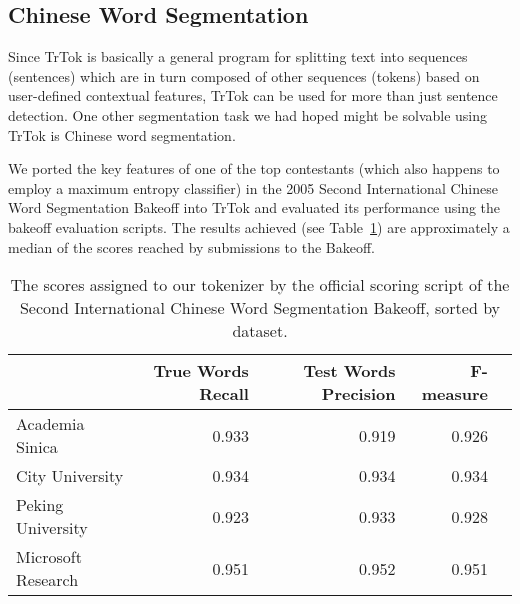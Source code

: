\subsection{Chinese Word Segmentation}

Since TrTok is basically a general program for splitting text into
sequences (sentences) which are in turn composed of other sequences
(tokens) based on user-defined contextual features, TrTok can be used
for more than just sentence detection. One other segmentation task we
had hoped might be solvable using TrTok is Chinese word segmentation.

We ported the key features of one of the top contestants (which also
happens to employ a maximum entropy classifier)
\cite{seg-chinese-maxent} in the 2005 Second International Chinese
Word Segmentation Bakeoff into TrTok and evaluated its performance
using the bakeoff evaluation scripts. The results achieved (see
Table~\ref{tbl:bakeoff-score}) are approximately a median of the
scores reached by submissions to the Bakeoff.

\begin{table}
  \begin{center}
    \begin{tabular}{ | l | r | r | r | r | }
      \hline
      & True Words Recall & Test Words Precision & F-measure \\ \hline
      Academia Sinica & 0.933 & 0.919 & 0.926 \\ \hline
      City University & 0.934 & 0.934 & 0.934 \\ \hline
      Peking University & 0.923 & 0.933 & 0.928 \\ \hline
      Microsoft Research & 0.951 & 0.952 & 0.951 \\
      \hline
    \end{tabular}
  \end{center}
  \caption[Chinese Word Segmentation scores]
    {The scores assigned to our tokenizer by the official scoring script of the
    Second International Chinese Word Segmentation Bakeoff, sorted by dataset.}
  \label{tbl:bakeoff-score}
\end{table}

